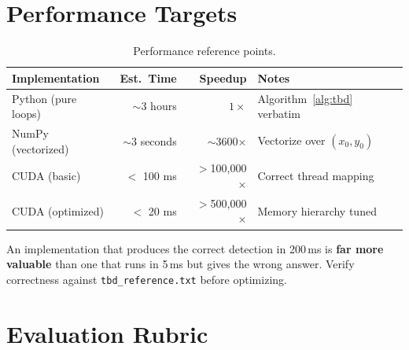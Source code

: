 \documentclass[11pt,letterpaper]{article}
\begin{document}
\section{Performance Targets}
\label{sec:performance}

\begin{table}[h]
\centering
\caption{Performance reference points.}
\label{tab:perf}
\begin{tabular}{@{}lrrl@{}}
\toprule
\textbf{Implementation} & \textbf{Est.\ Time} & \textbf{Speedup} & \textbf{Notes} \\
\midrule
Python (pure loops)      & $\sim$3 hours     & $1\times$        & Algorithm~\ref{alg:tbd} verbatim \\
NumPy (vectorized)       & $\sim$3 seconds   & $\sim$3600$\times$  & Vectorize over $(x_0, y_0)$ \\
CUDA (basic)             & $<$ 100 ms        & $>$100{,}000$\times$ & Correct thread mapping \\
CUDA (optimized)         & $<$ 20 ms         & $>$500{,}000$\times$ & Memory hierarchy tuned \\
\bottomrule
\end{tabular}
\end{table}

\begin{warnbox}
An implementation that produces the correct detection in 200\,ms is
\textbf{far more valuable} than one that runs in 5\,ms but gives the wrong
answer. Verify correctness against \texttt{tbd\_reference.txt} before
optimizing.
\end{warnbox}

\section{Evaluation Rubric}
\label{sec:rubric}
\end{document}

